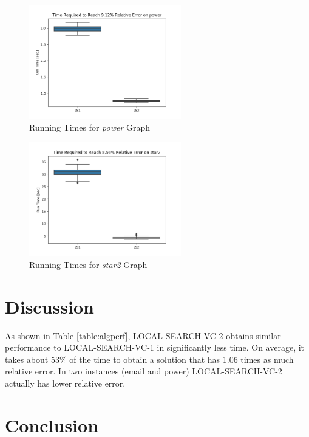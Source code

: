 \documentclass[sigconf]{acmart}
\begin{document}
\begin{figure}[h]
	\centering
	\includegraphics[width=250px]{plots/boxplot_power.png}
	\caption{Running Times for \textit{power} Graph}
	\label{figure:boxplot_power}
\end{figure}

\begin{figure}[h]
	\centering
	\includegraphics[width=250px]{plots/boxplot_star2.png}
	\caption{Running Times for \textit{star2} Graph}
	\label{figure:boxplot_star2}
\end{figure}

\section{Discussion}
As shown in Table \ref{table:algperf}, LOCAL-SEARCH-VC-2 obtains similar performance to LOCAL-SEARCH-VC-1 in significantly less time. On average, it takes about 53\% of the time to obtain a solution that has 1.06 times as much relative error. In two instances (email and power) LOCAL-SEARCH-VC-2 actually has lower relative error.

\section{Conclusion}


 
\end{document}
